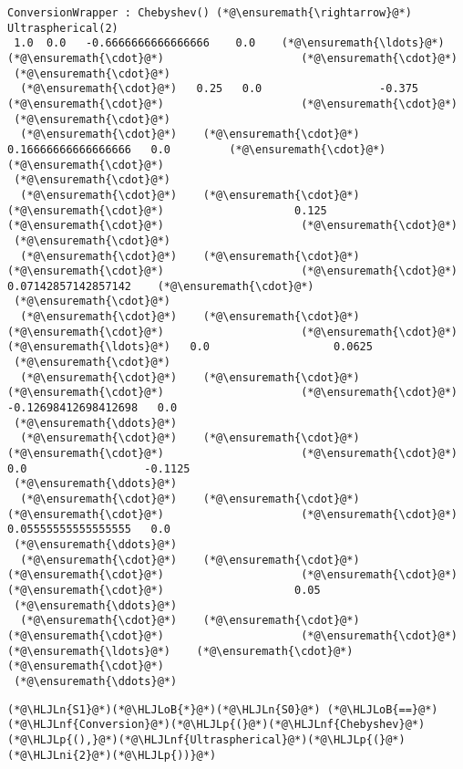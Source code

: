 \documentclass[12pt,landscape]{article}
\newcommand{\HLJLn}[1]{#1}
\newcommand{\HLJLnf}[1]{\textcolor[RGB]{66,102,213}{#1}}
\newcommand{\HLJLni}[1]{\textcolor[RGB]{59,151,46}{#1}}
\newcommand{\HLJLoB}[1]{\textcolor[RGB]{102,102,102}{\textbf{#1}}}
\newcommand{\HLJLp}[1]{#1}
\begin{document}
{\begin{lstlisting}
ConversionWrapper : Chebyshev() (*@\ensuremath{\rightarrow}@*) Ultraspherical(2)
 1.0  0.0   -0.6666666666666666    0.0    (*@\ensuremath{\ldots}@*)    (*@\ensuremath{\cdot}@*)                     (*@\ensuremath{\cdot}@*)     
 (*@\ensuremath{\cdot}@*)
  (*@\ensuremath{\cdot}@*)   0.25   0.0                  -0.375       (*@\ensuremath{\cdot}@*)                     (*@\ensuremath{\cdot}@*)     
 (*@\ensuremath{\cdot}@*)
  (*@\ensuremath{\cdot}@*)    (*@\ensuremath{\cdot}@*)     0.16666666666666666   0.0         (*@\ensuremath{\cdot}@*)                     (*@\ensuremath{\cdot}@*)     
 (*@\ensuremath{\cdot}@*)
  (*@\ensuremath{\cdot}@*)    (*@\ensuremath{\cdot}@*)      (*@\ensuremath{\cdot}@*)                    0.125       (*@\ensuremath{\cdot}@*)                     (*@\ensuremath{\cdot}@*)     
 (*@\ensuremath{\cdot}@*)
  (*@\ensuremath{\cdot}@*)    (*@\ensuremath{\cdot}@*)      (*@\ensuremath{\cdot}@*)                     (*@\ensuremath{\cdot}@*)         0.07142857142857142    (*@\ensuremath{\cdot}@*)     
 (*@\ensuremath{\cdot}@*)
  (*@\ensuremath{\cdot}@*)    (*@\ensuremath{\cdot}@*)      (*@\ensuremath{\cdot}@*)                     (*@\ensuremath{\cdot}@*)     (*@\ensuremath{\ldots}@*)   0.0                   0.0625 
 (*@\ensuremath{\cdot}@*)
  (*@\ensuremath{\cdot}@*)    (*@\ensuremath{\cdot}@*)      (*@\ensuremath{\cdot}@*)                     (*@\ensuremath{\cdot}@*)        -0.12698412698412698   0.0    
 (*@\ensuremath{\ddots}@*)
  (*@\ensuremath{\cdot}@*)    (*@\ensuremath{\cdot}@*)      (*@\ensuremath{\cdot}@*)                     (*@\ensuremath{\cdot}@*)         0.0                  -0.1125 
 (*@\ensuremath{\ddots}@*)
  (*@\ensuremath{\cdot}@*)    (*@\ensuremath{\cdot}@*)      (*@\ensuremath{\cdot}@*)                     (*@\ensuremath{\cdot}@*)         0.05555555555555555   0.0    
 (*@\ensuremath{\ddots}@*)
  (*@\ensuremath{\cdot}@*)    (*@\ensuremath{\cdot}@*)      (*@\ensuremath{\cdot}@*)                     (*@\ensuremath{\cdot}@*)          (*@\ensuremath{\cdot}@*)                    0.05   
 (*@\ensuremath{\ddots}@*)
  (*@\ensuremath{\cdot}@*)    (*@\ensuremath{\cdot}@*)      (*@\ensuremath{\cdot}@*)                     (*@\ensuremath{\cdot}@*)     (*@\ensuremath{\ldots}@*)    (*@\ensuremath{\cdot}@*)                     (*@\ensuremath{\cdot}@*)     
 (*@\ensuremath{\ddots}@*)
\end{lstlisting}


\begin{lstlisting}
(*@\HLJLn{S1}@*)(*@\HLJLoB{*}@*)(*@\HLJLn{S0}@*) (*@\HLJLoB{==}@*) (*@\HLJLnf{Conversion}@*)(*@\HLJLp{(}@*)(*@\HLJLnf{Chebyshev}@*)(*@\HLJLp{(),}@*)(*@\HLJLnf{Ultraspherical}@*)(*@\HLJLp{(}@*)(*@\HLJLni{2}@*)(*@\HLJLp{))}@*)
\end{lstlisting}

}
\end{document}

